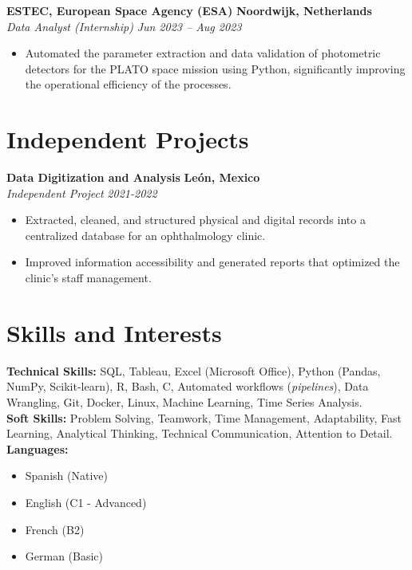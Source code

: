 \documentclass[10pt,a4paper]{article}
\begin{document}
\textbf{ESTEC, European Space Agency (ESA)} \hfill \textbf{Noordwijk, Netherlands}\\
\textit{Data Analyst (Internship)}  \hfill \textit{Jun 2023 -- Aug 2023}
\begin{itemize}[leftmargin=1.5em]
    \item Automated the parameter extraction and data validation of photometric detectors for the PLATO space mission using Python, significantly improving the operational efficiency of the processes.
\end{itemize}


\section*{Independent Projects}
\textbf{Data Digitization and Analysis} \hfill \textbf{León, Mexico} \\
\textit{Independent Project} \hfill \textit{2021-2022}
\begin{itemize}
\item Extracted, cleaned, and structured physical and digital records into a centralized database for an ophthalmology clinic.
\item Improved information accessibility and generated reports that optimized the clinic's staff management.
\end{itemize}

\section*{Skills and Interests}
\textbf{Technical Skills:} SQL, Tableau, Excel (Microsoft Office), Python (Pandas, NumPy, Scikit-learn), R, Bash, C, Automated workflows (\textit{pipelines}), Data Wrangling, Git, Docker, Linux, Machine Learning, Time Series Analysis. \\

\textbf{Soft Skills:} Problem Solving, Teamwork, Time Management, Adaptability, Fast Learning, Analytical Thinking, Technical Communication, Attention to Detail. \\

\textbf{Languages:} 
\begin{itemize}
 \item Spanish (Native) 
 \item English (C1 - Advanced)
 \item French (B2)
 \item German (Basic)
\end{itemize} 
\end{document}

